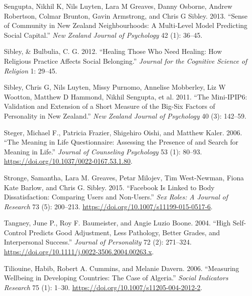 \documentclass[
  singlecolumn]{report}
\newlength{\cslhangindent}
\newlength{\cslentryspacingunit} %
\newenvironment{CSLReferences}[2] %
 {%
  \setlength{\parindent}{0pt}
  \ifodd #1
  \let\oldpar\par
  \def\par{\hangindent=\cslhangindent\oldpar}
  \fi
  \setlength{\parskip}{#2\cslentryspacingunit}
 }%
 {}
\begin{document}
\begin{CSLReferences}{1}{0}
\leavevmode{}%
Sengupta, Nikhil K, Nils Luyten, Lara M Greaves, Danny Osborne, Andrew
Robertson, Colmar Brunton, Gavin Armstrong, and Chris G Sibley. 2013.
{``Sense of Community in New Zealand Neighbourhoods: A Multi-Level Model
Predicting Social Capital.''} \emph{New Zealand Journal of Psychology}
42 (1): 36--45.

\leavevmode{}%
Sibley, \& Bulbulia, C. G. 2012. {``Healing Those Who Need Healing: How
Religious Practice Affects Social Belonging.''} \emph{Journal for the
Cognitive Science of Religion} 1: 29--45.

\leavevmode{}%
Sibley, Chris G, Nils Luyten, Missy Purnomo, Annelise Mobberley, Liz W
Wootton, Matthew D Hammond, Nikhil Sengupta, et al. 2011. {``The
Mini-IPIP6: Validation and Extension of a Short Measure of the Big-Six
Factors of Personality in New Zealand.''} \emph{New Zealand Journal of
Psychology} 40 (3): 142--59.

\leavevmode{}%
Steger, Michael F., Patricia Frazier, Shigehiro Oishi, and Matthew
Kaler. 2006. {``The Meaning in Life Questionnaire: Assessing the
Presence of and Search for Meaning in Life.''} \emph{Journal of
Counseling Psychology} 53 (1): 80--93.
\url{https://doi.org/10.1037/0022-0167.53.1.80}.

\leavevmode{}%
Stronge, Samantha, Lara M. Greaves, Petar Milojev, Tim West-Newman,
Fiona Kate Barlow, and Chris G. Sibley. 2015. {``Facebook Is Linked to
Body Dissatisfaction: Comparing Users and Non-Users.''} \emph{Sex Roles:
A Journal of Research} 73 (5): 200--213.
\url{https://doi.org/10.1007/s11199-015-0517-6}.

\leavevmode{}%
Tangney, June P., Roy F. Baumeister, and Angie Luzio Boone. 2004.
{``High Self-Control Predicts Good Adjustment, Less Pathology, Better
Grades, and Interpersonal Success.''} \emph{Journal of Personality} 72
(2): 271--324. \url{https://doi.org/10.1111/j.0022-3506.2004.00263.x}.

\leavevmode{}%
Tiliouine, Habib, Robert A. Cummins, and Melanie Davern. 2006.
{``Measuring Wellbeing in Developing Countries: The Case of Algeria.''}
\emph{Social Indicators Research} 75 (1): 1--30.
\url{https://doi.org/10.1007/s11205-004-2012-2}.


\end{CSLReferences}
\end{document}
